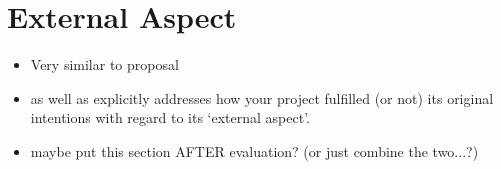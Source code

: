 \section{External Aspect}
{\color{red}
	\begin{itemize}
		\item Very similar to proposal
		\item as well as explicitly addresses how your project fulfilled (or not) its original intentions with regard to its `external aspect'.
		\item maybe put this section AFTER evaluation? (or just combine the two...?)
	\end{itemize}
}